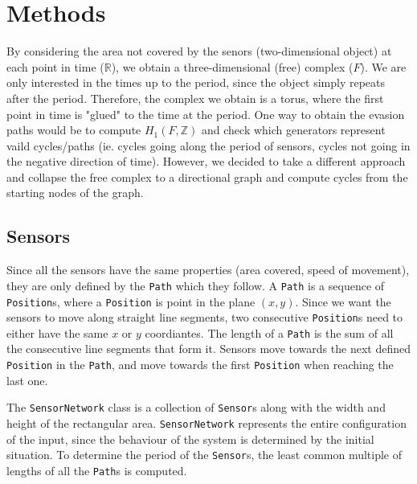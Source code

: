 \documentclass{article}
\begin{document}
\section{Methods}

By considering the area not covered by the senors (two-dimensional object) at each point in time ($\mathbb{R}$), we obtain a three-dimensional (free) complex ($ F $).
We are only interested in the times up to the period, since the object simply repeats after the period.
Therefore, the complex we obtain is a torus, where the first point in time is "glued" to the time at the period.
One way to obtain the evasion paths would be to compute $ H_1 (F, \mathbb{Z}) $ and check which generators represent vaild cycles/paths (ie. cycles going along the period of sensors, cycles not going in the negative direction of time).
However, we decided to take a different approach and collapse the free complex to a directional graph and compute cycles from the starting nodes of the graph.


\subsection{Sensors}

Since all the sensors have the same properties (area covered, speed of movement), they are only defined by the \texttt{Path} which they follow.
A \texttt{Path} is a sequence of \texttt{Position}s, where a \texttt{Position} is point in the plane $(x, y)$.
Since we want the sensors to move along straight line segments, two consecutive \texttt{Position}s need to either have the same $x$ or $y$ coordiantes.
The length of a \texttt{Path} is the sum of all the consecutive line segments that form it.
Sensors move towards the next defined \texttt{Position} in the \texttt{Path}, and move towards the first \texttt{Position} when reaching the last one.

The \texttt{SensorNetwork} class is a collection of \texttt{Sensor}s along with the width and height of the rectangular area.
\texttt{SensorNetwork} represents the entire configuration of the input, since the behaviour of the system is determined by the initial situation.
To determine the period of the \texttt{Sensor}s, the least common multiple of lengths of all the \texttt{Path}s is computed.
\end{document}
